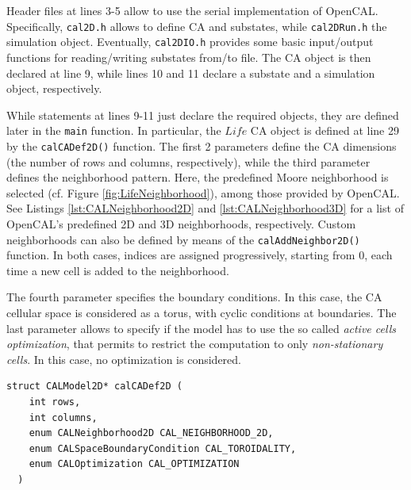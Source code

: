 Header files at lines 3-5 allow to use the serial implementation of
OpenCAL. Specifically, \verb'cal2D.h' allows to define CA and
substates, while \verb'cal2DRun.h' the simulation object. Eventually,
\verb'cal2DIO.h' provides some basic input/output functions for
reading/writing substates from/to file. The CA object is then declared
at line 9, while lines 10 and 11 declare a substate and a simulation
object, respectively.

While statements at lines 9-11 just declare the required objects, they
are defined later in the \verb'main' function. In particular, the $Life$
CA object is defined at line 29 by the \verb'calCADef2D()'
function. The first 2 parameters define the CA dimensions (the number
of rows and columns, respectively), while the third parameter defines
the neighborhood pattern. Here, the predefined Moore neighborhood is
selected (cf. Figure \ref{fig:LifeNeighborhood}), among those provided
by OpenCAL. See Listings \ref{lst:CALNeighborhood2D} and
\ref{lst:CALNeighborhood3D} for a list of OpenCAL's predefined 2D and
3D neighborhoods, respectively. Custom neighborhoods can also be
defined by means of the \verb'calAddNeighbor2D()' function. In both
cases, indices are assigned progressively, starting from 0, each time
a new cell is added to the neighborhood.

The fourth parameter specifies the boundary conditions. In this case,
the CA cellular space is considered as a torus, with cyclic conditions
at boundaries. The last parameter allows to specify if the model has
to use the so called \emph{active cells optimization}, that permits to
restrict the computation to only \emph{non-stationary cells}. In this
case, no optimization is considered.

\begin{lstlisting}[float, label=lst:calCADef2D, caption=Definition of the calCADef2D() function., numbers=none]
  struct CALModel2D* calCADef2D (
    int rows,
    int columns,
    enum CALNeighborhood2D CAL_NEIGHBORHOOD_2D,
    enum CALSpaceBoundaryCondition CAL_TOROIDALITY,
    enum CALOptimization CAL_OPTIMIZATION
  )
\end{lstlisting}

